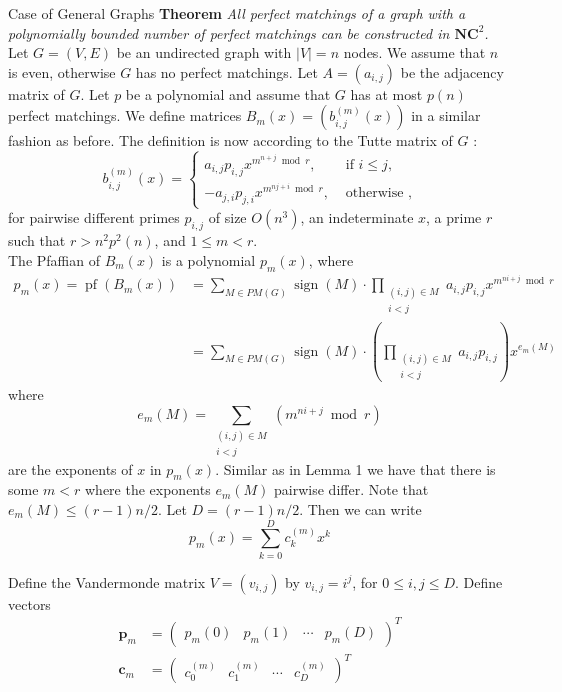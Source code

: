 \documentclass{beamer}
\begin{document}
\begin{frame}[allowframebreaks]{Case of General Graphs }
	\textbf{Theorem} \textit{All perfect matchings of a graph with a polynomially bounded number of perfect matchings can be constructed in $\mathbf{N C}^2$.} \\
	
	Let $G=(V, E)$ be an undirected graph with $|V|=n$ nodes. We assume that $n$ is even, otherwise $G$ has no perfect matchings. Let $A=\left(a_{i, j}\right)$ be the adjacency matrix of $G$. Let $p$ be a polynomial and assume that $G$ has at most $p(n)$ perfect matchings. We define matrices $B_m(x)=\left(b_{i, j}^{(m)}(x)\right)$ in a similar fashion as before. The definition is now according to the Tutte matrix of $G$ :
	$$
	b_{i, j}^{(m)}(x)= \begin{cases}a_{i, j} p_{i, j} x^{m^{n+j} \bmod r}, & \text { if } i \leq j, \\ -a_{j, i} p_{j, i} x^{m^{n j+i} \bmod r}, & \text { otherwise },\end{cases}
	$$
	for pairwise different primes $p_{i, j}$ of size $O\left(n^3\right)$, an indeterminate $x$, a prime $r$ such that $r>n^2 p^2(n)$, and $1 \leq m<r$.\\
	The Pfaffian of $B_m(x)$ is a polynomial $p_m(x)$, where
	$$
	\begin{aligned}
		p_m(x)=\operatorname{pf}\left(B_m(x)\right) & =\sum_{M \in P M(G)} \operatorname{sign}(M) \cdot \prod_{\substack{(i, j) \in M \\
				i<j}} a_{i, j} p_{i, j} x^{m^{n i+j} \bmod r} \\
		& =\sum_{M \in P M(G)} \operatorname{sign}(M) \cdot\left(\prod_{\substack{(i, j) \in M \\
				i<j}} a_{i, j} p_{i, j}\right) x^{e_m(M)}
	\end{aligned}
	$$
	where
	$$
	e_m(M)=\sum_{\substack{(i, j) \in M \\ i<j}}\left(m^{n i+j} \bmod r\right)
	$$
	are the exponents of $x$ in $p_m(x)$. Similar as in Lemma 1 we have that there is some $m<r$ where the exponents $e_m(M)$ pairwise differ.
	Note that $e_m(M) \leq(r-1) n / 2$. Let $D=(r-1) n / 2$. Then we can write
	$$
	p_m(x)=\sum_{k=0}^D c_k^{(m)} x^k
	$$
	
	Define the Vandermonde matrix $V=\left(v_{i, j}\right)$ by $v_{i, j}=i^j$, for $0 \leq i, j \leq D$. Define vectors
	$$
	\begin{aligned}
		\boldsymbol{p}_m & =\left(\begin{array}{llll}
			p_m(0) & p_m(1) & \cdots & p_m(D)
		\end{array}\right)^T \\
		\boldsymbol{c}_m & =\left(\begin{array}{llll}
			c_0^{(m)} & c_1^{(m)} & \cdots & c_D^{(m)}
		\end{array}\right)^T
	\end{aligned}
	$$
	

\end{frame}
\end{document}
